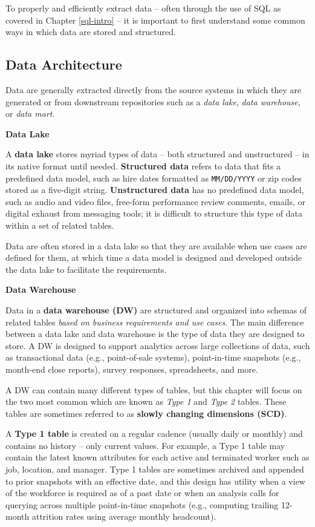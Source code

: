 \documentclass[
]{book}
\begin{document}
To properly and efficiently extract data -- often through the use of SQL as covered in Chapter \ref{sql-intro} -- it is important to first understand some common ways in which data are stored and structured.

\hypertarget{data-architecture}{%
\subsection{Data Architecture}\label{data-architecture}}

Data are generally extracted directly from the source systems in which they are generated or from downstream repositories such as a \emph{data lake}, \emph{data warehouse}, or \emph{data mart}.

\textbf{Data Lake}

A \textbf{data lake} stores myriad types of data -- both structured and unstructured -- in its native format until needed. \textbf{Structured data} refers to data that fits a predefined data model, such as hire dates formatted as \texttt{MM/DD/YYYY} or zip codes stored as a five-digit string. \textbf{Unstructured data} has no predefined data model, such as audio and video files, free-form performance review comments, emails, or digital exhaust from messaging tools; it is difficult to structure this type of data within a set of related tables.

Data are often stored in a data lake so that they are available when use cases are defined for them, at which time a data model is designed and developed outside the data lake to facilitate the requirements.

\textbf{Data Warehouse}

Data in a \textbf{data warehouse (DW)} are structured and organized into schemas of related tables \emph{based on business requirements and use cases}. The main difference between a data lake and data warehouse is the type of data they are designed to store. A DW is designed to support analytics across large collections of data, such as transactional data (e.g., point-of-sale systems), point-in-time snapshots (e.g., month-end close reports), survey responses, spreadsheets, and more.

A DW can contain many different types of tables, but this chapter will focus on the two most common which are known as \emph{Type 1} and \emph{Type 2} tables. These tables are sometimes referred to as \textbf{slowly changing dimensions (SCD)}.

A \textbf{Type 1 table} is created on a regular cadence (usually daily or monthly) and contains no history -- only current values. For example, a Type 1 table may contain the latest known attributes for each active and terminated worker such as job, location, and manager. Type 1 tables are sometimes archived and appended to prior snapshots with an effective date, and this design has utility when a view of the workforce is required as of a past date or when an analysis calls for querying across multiple point-in-time snapshots (e.g., computing trailing 12-month attrition rates using average monthly headcount).
\end{document}
